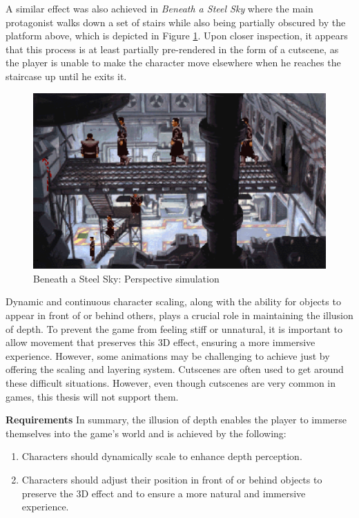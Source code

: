 A similar effect was also achieved in \textit{Beneath a Steel Sky} where the main protagonist walks down a set of stairs while also being partially obscured by the platform above, which is depicted in Figure \ref{fig:M-BaSS0}.  Upon closer inspection, it appears that this process is at least partially pre-rendered in the form of a cutscene, as the player is unable to make the character move elsewhere when he reaches the staircase up until he exits it. 

\begin{figure}[H]
\centering
\includegraphics[width=.8\linewidth]{img/M-BaSS00.png}
\caption{Beneath a Steel Sky: Perspective simulation}
\label{fig:M-BaSS0}
\end{figure}

Dynamic and continuous character scaling, along with the ability for objects to appear in front of or behind others, plays a crucial role in maintaining the illusion of depth. To prevent the game from feeling stiff or unnatural, it is important to allow movement that preserves this 3D effect, ensuring a more immersive experience. However, some animations may be challenging to achieve just by offering the scaling and layering system. Cutscenes are often used to get around these difficult situations. However, even though cutscenes are very common in games, this thesis will not support them.
\par
\vspace{5mm}
\textbf{Requirements} \quad In summary, the illusion of depth enables the player to immerse themselves into the game's world and is achieved by the following:

\begin{enumerate}[label=\color{teal}\textbf{R{\arabic*}},resume]
  \item \label{intro:req:scale} Characters should dynamically scale to enhance depth perception.
  \item \label{intro:req:layers} Characters should adjust their position in front of or behind objects to preserve the 3D effect and to ensure a more natural and immersive experience.
\end{enumerate}
    
